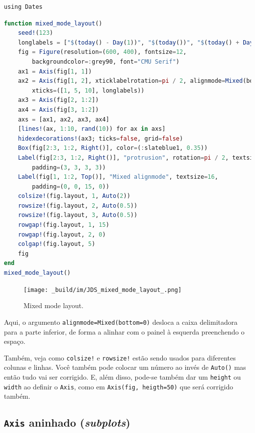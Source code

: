 \documentclass[
  notoc %
]{tufte-book}
\newcommand{\passthrough}[1]{#1}
\begin{document}
\begin{lstlisting}
using Dates
\end{lstlisting}

\begin{lstlisting}[language=Julia]
function mixed_mode_layout()
    seed!(123)
    longlabels = ["$(today() - Day(1))", "$(today())", "$(today() + Day(1))"]
    fig = Figure(resolution=(600, 400), fontsize=12,
        backgroundcolor=:grey90, font="CMU Serif")
    ax1 = Axis(fig[1, 1])
    ax2 = Axis(fig[1, 2], xticklabelrotation=pi / 2, alignmode=Mixed(bottom=0),
        xticks=([1, 5, 10], longlabels))
    ax3 = Axis(fig[2, 1:2])
    ax4 = Axis(fig[3, 1:2])
    axs = [ax1, ax2, ax3, ax4]
    [lines!(ax, 1:10, rand(10)) for ax in axs]
    hidexdecorations!(ax3; ticks=false, grid=false)
    Box(fig[2:3, 1:2, Right()], color=(:slateblue1, 0.35))
    Label(fig[2:3, 1:2, Right()], "protrusion", rotation=pi / 2, textsize=14,
        padding=(3, 3, 3, 3))
    Label(fig[1, 1:2, Top()], "Mixed alignmode", textsize=16,
        padding=(0, 0, 15, 0))
    colsize!(fig.layout, 1, Auto(2))
    rowsize!(fig.layout, 2, Auto(0.5))
    rowsize!(fig.layout, 3, Auto(0.5))
    rowgap!(fig.layout, 1, 15)
    rowgap!(fig.layout, 2, 0)
    colgap!(fig.layout, 5)
    fig
end
mixed_mode_layout()
\end{lstlisting}

\begin{figure}
\hypertarget{fig:mixed_mode_layout}{%
\centering
\texttt{[image: \_build/im/JDS\_mixed\_mode\_layout\_.png]}
\caption{Mixed mode layout.}\label{fig:mixed_mode_layout}
}
\end{figure}

Aqui, o argumento \passthrough{\lstinline!alignmode=Mixed(bottom=0)!}
desloca a caixa delimitadora para a parte inferior, de forma a alinhar
com o painel à esquerda preenchendo o espaço.

Também, veja como \passthrough{\lstinline"colsize!"} e
\passthrough{\lstinline"rowsize!"} estão sendo usados para diferentes
colunas e linhas. Você também pode colocar um número ao invés de
\passthrough{\lstinline!Auto()!} mas então tudo vai ser corrigido. E,
além disso, pode-se também dar um \passthrough{\lstinline!height!} ou
\passthrough{\lstinline!width!} ao definir o
\passthrough{\lstinline!Axis!}, como em
\passthrough{\lstinline!Axis(fig, heigth=50)!} que será corrigido
também.

\hypertarget{axis-aninhado-subplots}{%
\subsection{\texorpdfstring{\texttt{Axis} aninhado
(\emph{subplots})}{Axis aninhado (subplots)}}\label{axis-aninhado-subplots}}
\end{document}
